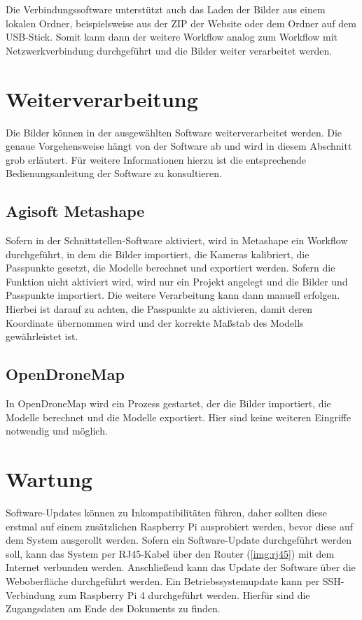 \documentclass[./00PhotoBox.tex]{subfiles}
\begin{document}
Die Verbindungssoftware unterstützt auch das Laden der Bilder aus einem lokalen Ordner, beispielsweise aus der ZIP der Website oder dem Ordner auf dem USB-Stick. Somit kann dann der weitere Workflow analog zum Workflow mit Netzwerkverbindung durchgeführt und die Bilder weiter verarbeitet werden.

\section{Weiterverarbeitung}
Die Bilder können in der ausgewählten Software weiterverarbeitet werden. Die genaue Vorgehensweise hängt von der Software ab und wird in diesem Abschnitt grob erläutert. Für weitere Informationen hierzu ist die entsprechende Bedienungsanleitung der Software zu konsultieren.

\subsection{Agisoft Metashape}
Sofern in der Schnittstellen-Software aktiviert, wird in Metashape ein Workflow durchgeführt, in dem die Bilder importiert, die Kameras kalibriert, die Passpunkte gesetzt, die Modelle berechnet und exportiert werden. Sofern die Funktion nicht aktiviert wird, wird nur ein Projekt angelegt und die Bilder und Passpunkte importiert. Die weitere Verarbeitung kann dann manuell erfolgen. Hierbei ist darauf zu achten, die Passpunkte zu aktivieren, damit deren Koordinate übernommen wird und der korrekte Maßstab des Modells gewährleistet ist.

\subsection{OpenDroneMap}
In OpenDroneMap wird ein Prozess gestartet, der die Bilder importiert, die Modelle berechnet und die Modelle exportiert. Hier sind keine weiteren Eingriffe notwendig und möglich. 


\section{Wartung}
Software-Updates können zu Inkompatibilitäten führen, daher sollten diese erstmal auf einem zusätzlichen Raspberry Pi ausprobiert werden, bevor diese auf dem System ausgerollt werden. Sofern ein Software-Update durchgeführt werden soll, kann das System per RJ45-Kabel über den Router (\autoref{img:rj45}) mit dem Internet verbunden werden. Anschließend kann das Update der Software über die Weboberfläche durchgeführt werden. Ein Betriebssystemupdate kann per SSH-Verbindung zum Raspberry Pi 4 durchgeführt werden. Hierfür sind die Zugangsdaten am Ende des Dokuments zu finden.
\end{document}

